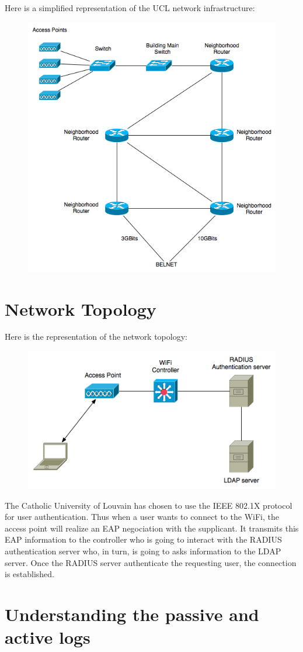 Here is a simplified representation of the UCL network infrastructure:
\begin{figure}[H]
	\includegraphics[width=.9\linewidth]{Pictures/Chapter2/infrastructure.png}
\end{figure}

\section{Network Topology}
Here is the representation of the network topology:
\begin{figure}[H]
	\includegraphics[width=.9\linewidth]{Pictures/Chapter2/topology.png}
\end{figure}
The Catholic University of Louvain has chosen to use the IEEE 802.1X protocol for user authentication. Thus when a user wants to connect to the WiFi, the access point will realize an EAP negociation with the supplicant. It transmits this EAP information to the controller who is going to interact with the RADIUS authentication server who, in turn, is going to asks information to the LDAP server. Once the RADIUS server authenticate the requesting user, the connection is established.




\section{Understanding the passive and active logs}